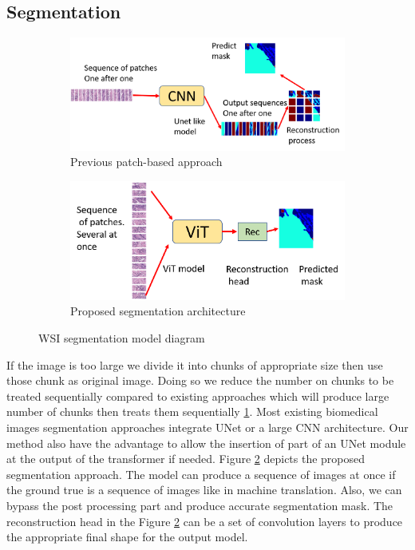 \documentclass[review]{cvpr}
\begin{document}
\subsection{Segmentation}
\begin{figure}[h]
\begin{subfigure}{0.5\textwidth}
\includegraphics[width=0.8\linewidth]{media/prev.png} 
\caption{Previous patch-based approach}
\label{fig:prev}
\end{subfigure}
\begin{subfigure}{0.5\textwidth}
\includegraphics[width=0.8\linewidth]{media/prop.png}
\caption{Proposed segmentation architecture}
\label{fig:prop}
\end{subfigure}

\caption{WSI segmentation model diagram}
\label{fig:seg}
\end{figure}

If the image is too large we divide it into chunks of appropriate size then use those chunk as original image. Doing so we reduce the number on chunks to be treated sequentially compared to existing approaches which will produce large number of chunks then treats them sequentially \ref{fig:prev}. Most existing biomedical images segmentation approaches integrate UNet\cite{ronneberger2015unet} or a large CNN architecture. Our method also have the advantage to allow the insertion of part of an UNet module at the output of the transformer if needed.
Figure \ref{fig:prop} depicts the proposed segmentation approach. The model can produce a sequence of images at once if the ground true is a sequence of images like in machine translation. Also, we can bypass the post processing part and produce accurate segmentation mask. The reconstruction head in the Figure \ref{fig:prop} can be a set of convolution layers to produce the appropriate final shape for the output model.
\end{document}
